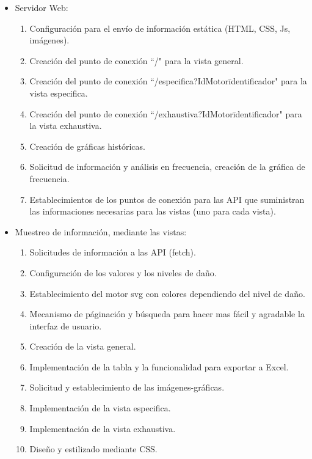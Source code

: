 \begin{itemize}
    \item Servidor Web:
        \begin{enumerate}
            \item Configuración para el envío de información estática
                (HTML, CSS, Js, imágenes).
            \item Creación del punto de conexión ``/" para la vista general.
            \item Creación del punto de conexión ``/especifica?IdMotor\= identificador"
                para la vista especifica.
            \item Creación del punto de conexión ``/exhaustiva?IdMotor\=identificador"
                para la vista exhaustiva.
            \item Creación de gráficas históricas.
            \item Solicitud de información y análisis en frecuencia, creación de
                la gráfica de frecuencia.
            \item Establecimientos de los puntos de conexión para las API que
                suministran las informaciones necesarias para las vistas (uno
                para cada vista).
        \end{enumerate}

    \item Muestreo de información, mediante las vistas:
        \begin{enumerate}
            \item Solicitudes de información a las API (fetch).
            \item Configuración de los valores y los niveles de daño.
            \item Establecimiento del motor svg con colores dependiendo del nivel
                de daño.
            \item Mecanismo de páginación y búsqueda para hacer mas fácil y agradable
                la interfaz de usuario.
            \item Creación de la vista general.
            \item Implementación de la tabla y la funcionalidad para exportar a
                Excel.
            \item Solicitud y establecimiento de las imágenes-gráficas.
            \item Implementación de la vista especifica.
            \item Implementación de la vista exhaustiva.
            \item Diseño y estilizado mediante CSS.
        \end{enumerate}


\end{itemize}
